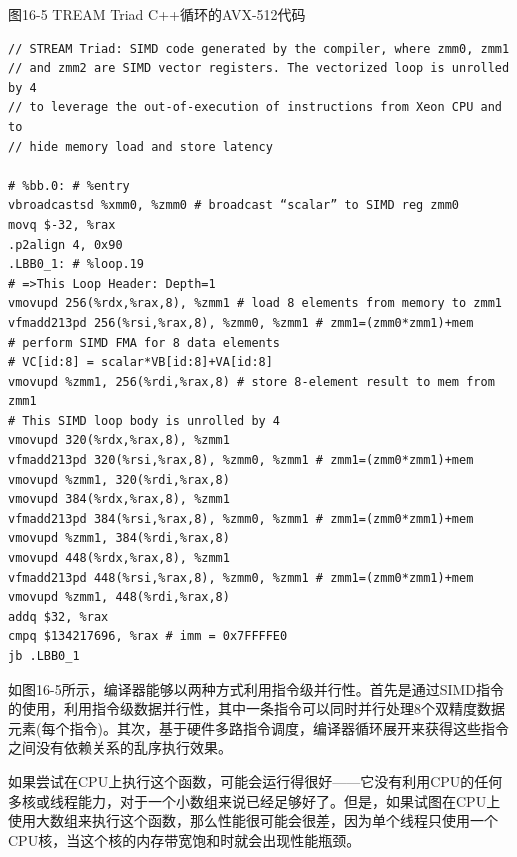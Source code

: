 \hspace*{\fill} \par %
图16-5 TREAM Triad C++循环的AVX-512代码
\begin{lstlisting}[caption={}]
// STREAM Triad: SIMD code generated by the compiler, where zmm0, zmm1 
// and zmm2 are SIMD vector registers. The vectorized loop is unrolled by 4
// to leverage the out-of-execution of instructions from Xeon CPU and to
// hide memory load and store latency 

# %bb.0: # %entry
vbroadcastsd %xmm0, %zmm0 # broadcast “scalar” to SIMD reg zmm0
movq $-32, %rax
.p2align 4, 0x90
.LBB0_1: # %loop.19
# =>This Loop Header: Depth=1
vmovupd 256(%rdx,%rax,8), %zmm1 # load 8 elements from memory to zmm1 
vfmadd213pd 256(%rsi,%rax,8), %zmm0, %zmm1 # zmm1=(zmm0*zmm1)+mem
# perform SIMD FMA for 8 data elements 
# VC[id:8] = scalar*VB[id:8]+VA[id:8] 
vmovupd %zmm1, 256(%rdi,%rax,8) # store 8-element result to mem from zmm1 
# This SIMD loop body is unrolled by 4
vmovupd 320(%rdx,%rax,8), %zmm1
vfmadd213pd 320(%rsi,%rax,8), %zmm0, %zmm1 # zmm1=(zmm0*zmm1)+mem
vmovupd %zmm1, 320(%rdi,%rax,8)
vmovupd 384(%rdx,%rax,8), %zmm1
vfmadd213pd 384(%rsi,%rax,8), %zmm0, %zmm1 # zmm1=(zmm0*zmm1)+mem
vmovupd %zmm1, 384(%rdi,%rax,8)
vmovupd 448(%rdx,%rax,8), %zmm1
vfmadd213pd 448(%rsi,%rax,8), %zmm0, %zmm1 # zmm1=(zmm0*zmm1)+mem
vmovupd %zmm1, 448(%rdi,%rax,8)
addq $32, %rax
cmpq $134217696, %rax # imm = 0x7FFFFE0
jb .LBB0_1
\end{lstlisting}

如图16-5所示，编译器能够以两种方式利用指令级并行性。首先是通过SIMD指令的使用，利用指令级数据并行性，其中一条指令可以同时并行处理8个双精度数据元素(每个指令)。其次，基于硬件多路指令调度，编译器循环展开来获得这些指令之间没有依赖关系的乱序执行效果。\par

如果尝试在CPU上执行这个函数，可能会运行得很好——它没有利用CPU的任何多核或线程能力，对于一个小数组来说已经足够好了。但是，如果试图在CPU上使用大数组来执行这个函数，那么性能很可能会很差，因为单个线程只使用一个CPU核，当这个核的内存带宽饱和时就会出现性能瓶颈。\par

























































